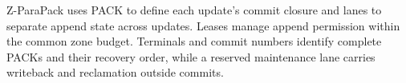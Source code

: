 Z-ParaPack uses PACK to define each update's commit closure and lanes to separate append state across updates.
Leases manage append permission within the common zone budget.
Terminals and commit numbers identify complete PACKs and their recovery order, while a reserved maintenance lane carries writeback and reclamation outside commits.
